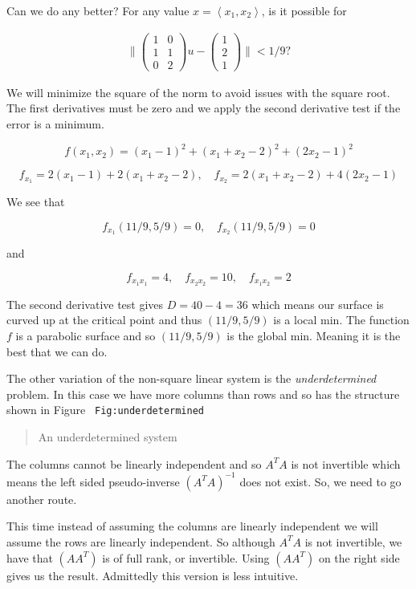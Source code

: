 Can we do any better? For any value \(x = \left< x_1, x_2\right>\), is
it possible for

\[\begin{aligned}
\|  \begin{pmatrix} 1 & 0 \\ 1 & 1 \\ 0 & 2 \end{pmatrix}u -  \begin{pmatrix} 1 \\ 2 \\ 1 \end{pmatrix} \| < 1/9?
\end{aligned}\]

We will minimize the square of the norm to avoid issues with the square
root. The first derivatives must be zero and we apply the second
derivative test if the error is a minimum.

\[f(x_1,x_2) = (x_1 - 1)^2 + (x_1+x_2 - 2)^2 + (2x_2-1)^2\]

\[f_{x_1} = 2(x_1-1)  + 2(x_1+x_2-2), \quad f_{x_2} =  2(x_1+x_2-2) + 4(2x_2-1)\]

We see that

\[f_{x_1}(11/9, 5/9) = 0, \quad  f_{x_2} (11/9, 5/9) = 0\]

and

\[f_{x_1x_1} = 4, \quad f_{x_2x_2} =  10, \quad f_{x_1x_2} =2\]

The second derivative test gives \(D = 40- 4=36\) which means our
surface is curved up at the critical point and thus \((11/9, 5/9)\) is a
local min. The function \(f\) is a parabolic surface and so
\((11/9, 5/9)\) is the global min. Meaning it is the best that we can
do.

The other variation of the non-square linear system is the
\emph{underdetermined} problem. In this case we have more columns than
rows and so has the structure shown in Figure~
\texttt{Fig:underdetermined}

\begin{quote}
An underdetermined system
\end{quote}

The columns cannot be linearly independent and so \(A^TA\) is not
invertible which means the left sided pseudo-inverse
\(\left(A^TA\right)^{-1}\) does not exist. So, we need to go another
route.

This time instead of assuming the columns are linearly independent we
will assume the rows are linearly independent. So although \(A^T A\) is
not invertible, we have that \(\left(A A^T\right)\) is of full rank, or
invertible. Using \(\left(A A^T\right)\) on the right side gives us the
result. Admittedly this version is less intuitive.

